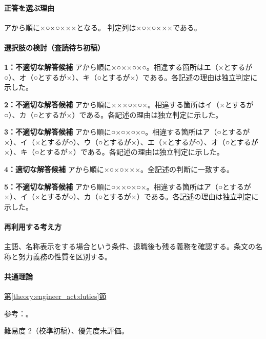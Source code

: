 \paragraph{正答を選ぶ理由} アから順に×○×○×××となる。  判定列は×○×○×××である。

\paragraph{選択肢の検討（査読待ち初稿）}\mbox{}\par

\noindent\textbf{1：不適切な解答候補} アから順に×○××○×○。相違する箇所はエ（×とするが○）、オ（○とするが×）、キ（○とするが×）である。各記述の理由は独立判定に示した。\par

\noindent\textbf{2：不適切な解答候補} アから順に×××○×○×。相違する箇所はイ（×とするが○）、カ（○とするが×）である。各記述の理由は独立判定に示した。\par

\noindent\textbf{3：不適切な解答候補} アから順に○×○×○×○。相違する箇所はア（○とするが×）、イ（×とするが○）、ウ（○とするが×）、エ（×とするが○）、オ（○とするが×）、キ（○とするが×）である。各記述の理由は独立判定に示した。\par

\noindent\textbf{4：適切な解答候補} アから順に×○×○×××。全記述の判断に一致する。\par

\noindent\textbf{5：不適切な解答候補} アから順に○××○×○×。相違する箇所はア（○とするが×）、イ（×とするが○）、カ（○とするが×）である。各記述の理由は独立判定に示した。\par

\paragraph{再利用する考え方} 主語、名称表示をする場合という条件、退職後も残る義務を確認する。条文の名称と努力義務の性質を区別する。

\paragraph{共通理論} \hyperref[theory:engineer_act:duties]{第\ref*{theory:engineer_act:duties}節}

\par 参考：\cite{engineer_act_current}。

\par 難易度 2（校準初稿）、優先度未評価。

